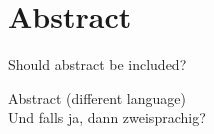 %
\chapter*{Abstract}
\label{sec:abstract}
\vspace*{-10mm}

Should abstract be included?

\vspace*{20mm}

{Abstract (different language)}\label{sec:abstract-diff} \\

Und falls ja, dann zweisprachig?
